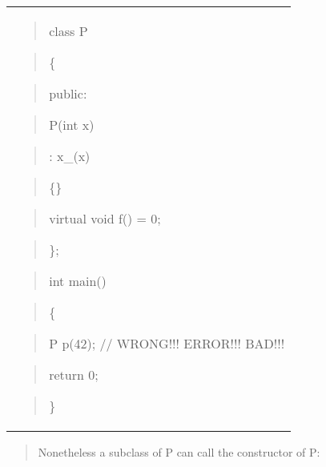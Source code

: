 \documentclass[
]{article}
\begin{document}
\begin{longtable}[]{@{}
  >{\raggedright\arraybackslash}p{}@{}}
\toprule\noalign{}
 \\
\midrule\noalign{}
\endhead
\bottomrule\noalign{}
\endlastfoot
\begin{quote}
class P
\end{quote}

\begin{quote}
\{
\end{quote}

\begin{quote}
public:
\end{quote}

\begin{quote}
P(int x)
\end{quote}

\begin{quote}
: x\_(x)
\end{quote}

\begin{quote}
\{\}
\end{quote}

\begin{quote}
\textbf{ }virtual void f() = 0;
\end{quote}

\begin{quote}
\};
\end{quote}

\begin{quote}
\end{quote}

\begin{quote}
int main()
\end{quote}

\begin{quote}
\{
\end{quote}

\begin{quote}
P p(42); // WRONG!!! ERROR!!! BAD!!!
\end{quote}

\begin{quote}
return 0;
\end{quote}

\begin{quote}
\}
\end{quote} \\
\end{longtable}

\begin{quote}
Nonetheless a subclass of P can call the constructor of P:
\end{quote}
\end{document}
